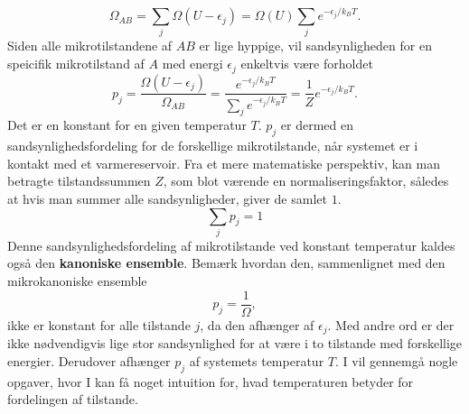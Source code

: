\[ \Omega_{AB}=\sum_j\Omega(U-\epsilon_j)=\Omega(U)\sum_j e^{-\epsilon_j/k_BT}. \]
Siden alle mikrotilstandene af $AB$ er lige hyppige, vil sandsynligheden for en speicifik mikrotilstand af $A$ med energi $\epsilon_j$ enkeltvis være forholdet
\begin{equation}\label{eq:canonicalensemble}
	p_j=\frac{\Omega(U-\epsilon_j)}{\Omega_{AB}}=\frac{e^{-\epsilon_j/k_BT}}{\sum_j e^{-\epsilon_j/k_BT}}=\frac{1}{Z}e^{-\epsilon_j/k_BT}.
\end{equation}
Det er en konstant for en given temperatur $T$. $p_j$ er dermed en sandsynlighedsfordeling for de forskellige mikrotilstande, når systemet er i kontakt med et varmereservoir. Fra et mere matematiske perspektiv, kan man betragte tilstandssummen $Z$, som blot værende en normaliseringsfaktor, således at hvis man summer alle sandsynligheder, giver de samlet $1$.
\[ \sum_j p_j=1 \]
Denne sandsynlighedsfordeling af mikrotilstande ved konstant temperatur kaldes også den \textbf{kanoniske ensemble}. Bemærk hvordan den, sammenlignet med den mikrokanoniske ensemble
\[ p_j=\frac{1}{\Omega}, \]
ikke er konstant for alle tilstande $j$, da den afhænger af $\epsilon_j$. Med andre ord er der ikke nødvendigvis lige stor sandsynlighed for at være i to tilstande med forskellige energier. Derudover afhænger $p_j$ af systemets temperatur $T$. I vil gennemgå nogle opgaver, hvor I kan få noget intuition for, hvad temperaturen betyder for fordelingen af tilstande.

